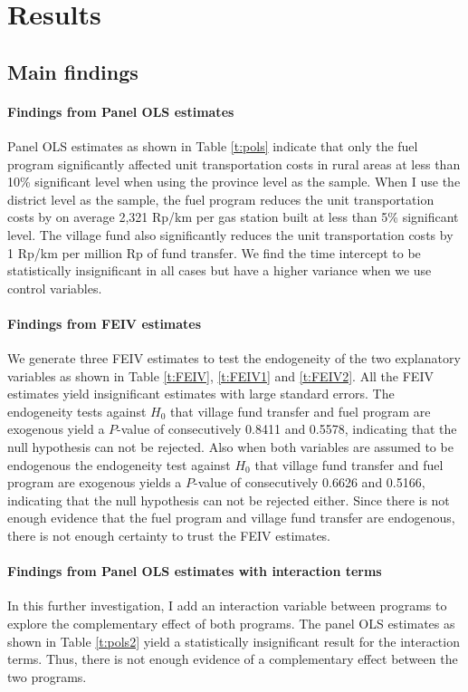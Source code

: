 \documentclass[letterpaper,12pt,leqno]{article}
\begin{document}
\section{Results}\label{s:result}
\subsection{Main findings}\label{ss:findings}

\paragraph{Findings from Panel OLS estimates} Panel OLS estimates as shown in Table \ref{t:pols} indicate that only the fuel program significantly affected unit transportation costs in rural areas at less than 10\% significant level when using the province level as the sample. When I use the district level as the sample, the fuel program reduces the unit transportation costs by on average 2,321 Rp/km per gas station built at less than 5\% significant level. The village fund also significantly reduces the unit transportation costs by 1 Rp/km per million Rp of fund transfer. We find the time intercept to be statistically insignificant in all cases but have a higher variance when we use control variables.
        
\paragraph{Findings from FEIV estimates} We generate three FEIV estimates to test the endogeneity of the two explanatory variables as shown in Table \ref{t:FEIV}, \ref{t:FEIV1} and \ref{t:FEIV2}. All the FEIV estimates yield insignificant estimates with large standard errors. The endogeneity tests against $H_0$ that village fund transfer and fuel program are exogenous yield a $P$-value of consecutively 0.8411 and 0.5578, indicating that the null hypothesis can not be rejected. Also when both variables are assumed to be endogenous the endogeneity test against $H_0$ that village fund transfer and fuel program are exogenous yields a $P$-value of consecutively 0.6626 and 0.5166, indicating that the null hypothesis can not be rejected either. Since there is not enough evidence that the fuel program and village fund transfer are endogenous, there is not enough certainty to trust the FEIV estimates.

\paragraph{Findings from Panel OLS estimates with interaction terms} In this further investigation, I add an interaction variable between programs to explore the complementary effect of both programs. The panel OLS estimates as shown in Table \ref{t:pols2} yield a statistically insignificant result for the interaction terms. Thus, there is not enough evidence of a complementary effect between the two programs.
\end{document}
